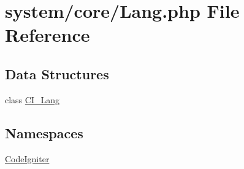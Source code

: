 \hypertarget{_lang_8php}{\section{system/core/\-Lang.php File Reference}
\label{_lang_8php}
}
\subsection*{Data Structures}
\begin{DoxyCompactItemize}
\item 
class \hyperlink{class_c_i___lang}{C\-I\-\_\-\-Lang}
\end{DoxyCompactItemize}
\subsection*{Namespaces}
\begin{DoxyCompactItemize}
\item 
\hyperlink{namespace_code_igniter}{Code\-Igniter}
\end{DoxyCompactItemize}

